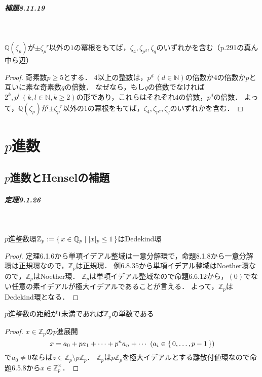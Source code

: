\paragraph{補題8.11.19}~
\begin{screen}
  $ \mathbb{Q}( \zeta_p)$が$ \pm \zeta_p{}^{r}$以外の$1$の冪根をもてば，$ \zeta_4, \zeta_{p^d}, \zeta_q$のいずれかを含む（p.291の真ん中ら辺）
\end{screen}
\begin{proof}
  奇素数$p \geq 5$とする．
  $4$以上の整数は，$p^d \ (d \in \mathbb{N})$の倍数か$4$の倍数か$p$と互いに素な奇素数$q$の倍数．
  なぜなら，もし$q$の倍数でなければ$2^k, p^l \ (k, l \in \mathbb{N}, k \geq 2)$の形であり，これらはそれぞれ$4$の倍数，$p^d$の倍数．
  よって，$ \mathbb{Q}( \zeta_p)$が$ \pm \zeta_p{}^{r}$以外の$1$の冪根をもてば，$ \zeta_4, \zeta_{p^d}, \zeta_q$のいずれかを含む．
\end{proof}

\chapter{$p$進数}
\section{$p$進数とHenselの補題}
\paragraph{定理9.1.26}~
\begin{screen}
  $p$進整数環$ \mathbb{Z}_p: = \set{x \in \mathbb{Q}_p| |x|_p \leq 1}$はDedekind環
\end{screen}
\begin{proof}
  定理6.1.6から単項イデアル整域は一意分解環で，命題8.1.8から一意分解環は正規環なので，$ \mathbb{Z}_p$は正規環．
  例6.8.35から単項イデアル整域はNoether環なので，$ \mathbb{Z}_p$はNoether環．
  $ \mathbb{Z}_p$は単項イデアル整域なので命題6.6.12から，$(0)$でない任意の素イデアルが極大イデアルであることが言える．
  よって，$ \mathbb{Z}_p$はDedekind環となる．
\end{proof}

\begin{screen}
  $p$進整数の距離が$1$未満であれば$ \mathbb{Z}_p$の単数である
\end{screen}
\begin{proof}
  $x \in \mathbb{Z}_p$の$p$進展開
  \[x = a_0+pa_1+ \cdots+p^na_n+ \cdots \ (a_i \in \set{0, \ldots, p-1}) \]
  で$a_0 \neq 0$ならば$z \in \mathbb{Z}_p \setminus p \mathbb{Z}_p$．
  $ \mathbb{Z}_p$は$p \mathbb{Z}_p$を極大イデアルとする離散付値環なので命題6.5.8から$x \in \mathbb{Z}_p^ \times$．
\end{proof}


